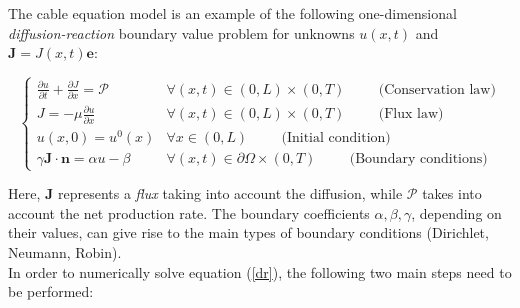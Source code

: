 \documentclass[12pt, a4paper]{report}
\begin{document}
The cable equation model is an example of the following one-dimensional \textit{diffusion-reaction} boundary value problem for unknowns $ u(x,t)$ and $\textbf{J} = J(x,t)\textbf{e}$:


\begin{equation}
\begin{cases}
\frac{\partial u}{\partial t} +\frac{\partial J}{\partial x} = \mathcal{P} & \forall (x,t) \in (0,L) \times (0,T) \hspace{1cm} \text{(Conservation law)} \\
J = - \mu \frac{\partial u}{\partial x} & \forall (x,t) \in (0,L) \times (0,T) \hspace{1cm} \text{(Flux law)}\\
u(x,0) = u^0(x) & \forall x \in (0,L) \hspace{1cm}  \text{(Initial condition)} \\
\gamma \textbf{J} \cdot \textbf{n} = \alpha u - \beta &  \forall (x,t) \in \partial \Omega \times (0,T) \hspace{1cm} \text{(Boundary conditions)}
\end{cases} \label{dr}
\end{equation}

Here, $\textbf{J}$  represents a \textit{flux} taking into account the diffusion, while $\mathcal{P}$ takes into account the  net production rate. The boundary coefficients $\alpha, \beta, \gamma$, depending on their values, can give rise to the main types of boundary conditions (Dirichlet, Neumann, Robin).\\
In order to numerically solve equation (\ref{dr}), the following two main steps need to be performed:
\end{document}
